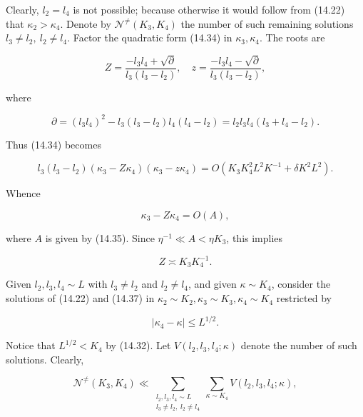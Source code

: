 \documentclass[10pt]{article}
\begin{document}
Clearly, $l_{2}=l_{4}$ is not possible; because otherwise it would follow from (14.22) that $\kappa_{2}>\kappa_{4}$. Denote by $\mathscr{N}^{\neq}\left(K_{3}, K_{4}\right)$ the number of such remaining solutions $l_{3}\neq l_{2},\ l_{2}\neq l_{4}$. Factor the quadratic form (14.34) in $\kappa_{3}, \kappa_{4}$. The roots are

$$
Z=\frac{-l_{3} l_{4}+\sqrt{\partial}}{l_{3}\left(l_{3}-l_{2}\right)}, \quad z=\frac{-l_{3} l_{4}-\sqrt{\partial}}{l_{3}\left(l_{3}-l_{2}\right)},
$$

where

$$
\partial=\left(l_{3} l_{4}\right)^{2}-l_{3}\left(l_{3}-l_{2}\right) l_{4}\left(l_{4}-l_{2}\right)=l_{2} l_{3} l_{4}\left(l_{3}+l_{4}-l_{2}\right) .
$$

Thus (14.34) becomes

$$
l_{3}\left(l_{3}-l_{2}\right)\left(\kappa_{3}-Z \kappa_{4}\right)\left(\kappa_{3}-z \kappa_{4}\right)=O\left(K_{3} K_{4}^{2} L^{2} K^{-1}+\delta K^{2} L^{2}\right) .
$$

Whence


\begin{equation*}
\kappa_{3}-Z \kappa_{4}=O(A), \tag{14.37}
\end{equation*}


where $A$ is given by (14.35). Since $\eta^{-1} \ll A<\eta K_{3}$, this implies


\begin{equation*}
Z \asymp K_{3} K_{4}^{-1} . \tag{14.38}
\end{equation*}


Given $l_{2},l_{3},l_{4}\sim L$ with $l_{3}\neq l_{2}$ and $l_{2}\neq l_{4}$, and given $\kappa\sim K_{4}$, consider the solutions of (14.22) and (14.37) in $\kappa_{2} \sim K_{2}, \kappa_{3} \sim K_{3}, \kappa_{4} \sim K_{4}$ restricted by


\begin{equation*}
\left|\kappa_{4}-\kappa\right| \leqslant L^{1 / 2} . \tag{14.39}
\end{equation*}


Notice that $L^{1 / 2}<K_{4}$ by (14.32). Let $V\left(l_{2}, l_{3}, l_{4} ; \kappa\right)$ denote the number of such solutions. Clearly,


\begin{equation*}
\mathscr{N}^{\neq}\left(K_{3}, K_{4}\right) \ll \sum_{\substack{l_{2},l_{3},l_{4} \sim L\\ l_{3}\neq l_{2},\; l_{2}\neq l_{4}}} \sum_{\kappa \sim K_{4}} V\left(l_{2}, l_{3}, l_{4} ; \kappa\right), \tag{14.40}
\end{equation*}
\end{document}
